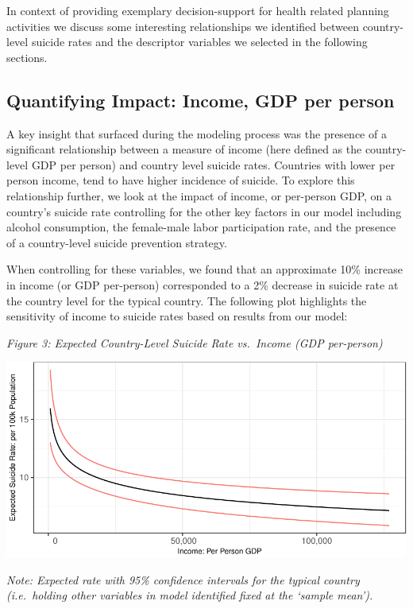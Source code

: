 \documentclass[]{article}
\begin{document}
In context of providing exemplary decision-support for health related
planning activities we discuss some interesting relationships we
identified between country-level suicide rates and the descriptor
variables we selected in the following sections.

\subsection{Quantifying Impact: Income, GDP per
person}\label{quantifying-impact-income-gdp-per-person}

A key insight that surfaced during the modeling process was the presence
of a significant relationship between a measure of income (here defined
as the country-level GDP per person) and country level suicide rates.
Countries with lower per person income, tend to have higher incidence of
suicide. To explore this relationship further, we look at the impact of
income, or per-person GDP, on a country's suicide rate controlling for
the other key factors in our model including alcohol consumption, the
female-male labor participation rate, and the presence of a
country-level suicide prevention strategy.

When controlling for these variables, we found that an approximate 10\%
increase in income (or GDP per-person) corresponded to a 2\% decrease in
suicide rate at the country level for the typical country. The following
plot highlights the sensitivity of income to suicide rates based on
results from our model:

\emph{Figure 3: Expected Country-Level Suicide Rate vs.~Income (GDP
per-person)}

\begin{center}\includegraphics{Project_Report_files/figure-latex/agdp_plot-1} \end{center}

\emph{Note: Expected rate with 95\% confidence intervals for the typical
country (i.e.~holding other variables in model identified fixed at the
`sample mean').}
\end{document}
